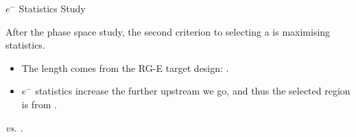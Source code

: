 \begin{frame}{$e^-$ Statistics Study}
    \label{12.21::e-_statistics_study}

    After the phase space study, the second criterion to selecting a  is maximising statistics.

    \begin{itemize}
        \item
            The length comes from the RG-E target design: .

        \item
            $e^-$ statistics increase the further upstream we go, and thus the selected region is from .
    \end{itemize}

    \begin{center}
        \begin{figure}[t]
        \end{figure}
        \scriptsize{\textit{ vs. .}}
    \end{center}
\end{frame}

